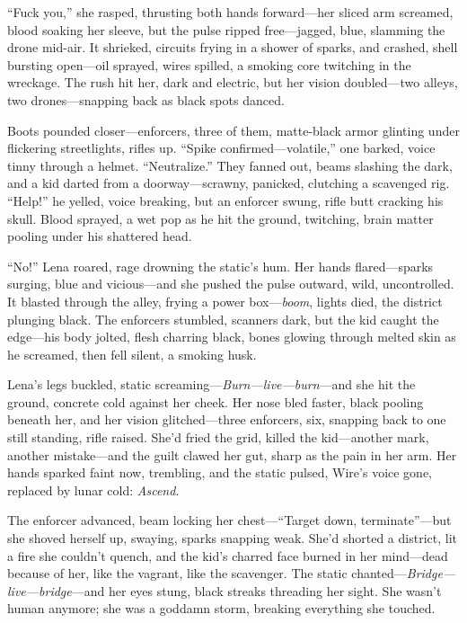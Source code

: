 \documentclass[12pt]{book}
\begin{document}
``Fuck you,'' she rasped, thrusting both hands forward---her sliced arm screamed, blood soaking her sleeve, but the pulse ripped free---jagged, blue, slamming the drone mid-air. It shrieked, circuits frying in a shower of sparks, and crashed, shell bursting open---oil sprayed, wires spilled, a smoking core twitching in the wreckage. The rush hit her, dark and electric, but her vision doubled---two alleys, two drones---snapping back as black spots danced.

Boots pounded closer---enforcers, three of them, matte-black armor glinting under flickering streetlights, rifles up. ``Spike confirmed---volatile,'' one barked, voice tinny through a helmet. ``Neutralize.'' They fanned out, beams slashing the dark, and a kid darted from a doorway---scrawny, panicked, clutching a scavenged rig. ``Help!'' he yelled, voice breaking, but an enforcer swung, rifle butt cracking his skull. Blood sprayed, a wet pop as he hit the ground, twitching, brain matter pooling under his shattered head.

``No!'' Lena roared, rage drowning the static’s hum. Her hands flared---sparks surging, blue and vicious---and she pushed the pulse outward, wild, uncontrolled. It blasted through the alley, frying a power box---\textit{boom}, lights died, the district plunging black. The enforcers stumbled, scanners dark, but the kid caught the edge---his body jolted, flesh charring black, bones glowing through melted skin as he screamed, then fell silent, a smoking husk.

Lena’s legs buckled, static screaming---\textit{Burn---live---burn}---and she hit the ground, concrete cold against her cheek. Her nose bled faster, black pooling beneath her, and her vision glitched---three enforcers, six, snapping back to one still standing, rifle raised. She’d fried the grid, killed the kid---another mark, another mistake---and the guilt clawed her gut, sharp as the pain in her arm. Her hands sparked faint now, trembling, and the static pulsed, Wire’s voice gone, replaced by lunar cold: \textit{Ascend}.

The enforcer advanced, beam locking her chest---``Target down, terminate''---but she shoved herself up, swaying, sparks snapping weak. She’d shorted a district, lit a fire she couldn’t quench, and the kid’s charred face burned in her mind---dead because of her, like the vagrant, like the scavenger. The static chanted---\textit{Bridge---live---bridge}---and her eyes stung, black streaks threading her sight. She wasn’t human anymore; she was a goddamn storm, breaking everything she touched.
\end{document}
